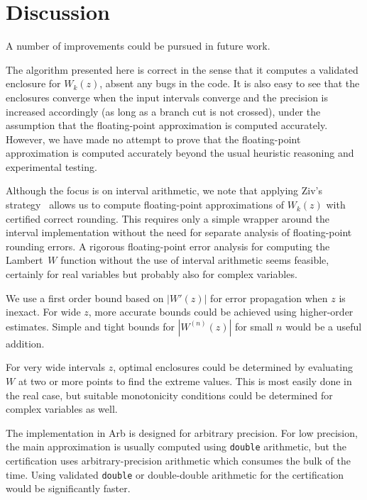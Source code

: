 \documentclass[11pt,a4paper]{article}
\begin{document}

\section{Discussion}

A number of improvements could be pursued in future work.

The algorithm presented here is correct in the sense that
it computes a validated enclosure for $W_k(z)$, absent any bugs
in the code. It is also easy to see that the enclosures converge
when the input intervals converge and the precision is increased
accordingly (as long as a branch cut is not crossed),
under the assumption that the floating-point
approximation is computed accurately.
However, we have made no attempt to prove that the floating-point
approximation is computed accurately beyond 
the usual heuristic reasoning and experimental testing.

Although the focus is on interval arithmetic,
we note that applying Ziv's strategy~\cite{ziv1991fast}
allows us to compute
floating-point approximations of $W_k(z)$ with certified correct rounding.
This requires only a simple wrapper around the interval implementation
without the need for separate analysis of floating-point rounding errors.
A rigorous floating-point error analysis for computing the Lambert~$W$
function without the use of interval arithmetic seems feasible,
certainly for real variables but probably also for complex variables.

We use a first order bound based on $|W'(z)|$ for error propagation
when $z$ is inexact.
For wide $z$, more accurate bounds could be achieved using higher-order
estimates. Simple and tight bounds for $|W^{(n)}(z)|$ for small $n$
would be a useful addition.

For very wide intervals $z$, optimal enclosures
could be determined by evaluating $W$ at two or more points to find
the extreme values.
This is most easily done in the real case,
but suitable monotonicity conditions could be determined for complex variables as well.

The implementation in Arb is designed for arbitrary precision.
For low precision, the main approximation is usually computed using
\texttt{double} arithmetic, but the certification uses arbitrary-precision arithmetic
which consumes the bulk of the time.
Using validated \texttt{double} or double-double arithmetic
for the certification would be significantly faster.



\end{document}
